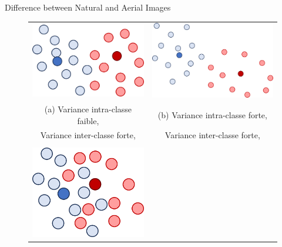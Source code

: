 \begin{subsectionframemod}{Difference between Natural and Aerial Images}
    \begin{figure}[!h]
    \centering
    \begin{tabular}{cc}
        \includegraphics[scale=0.25]{Figures/con_sep.png} &
        \includegraphics[scale=0.25]{Figures/ncon_sep.png} \\
        (a) Variance intra-classe faible, & (b) Variance intra-classe forte,\\
         Variance inter-classe forte, & Variance inter-classe forte, \\
         \\
        \includegraphics[scale=0.25]{Figures/con_nsep.png} &

\end{tabular}
\end{figure}
\end{subsectionframemod}

